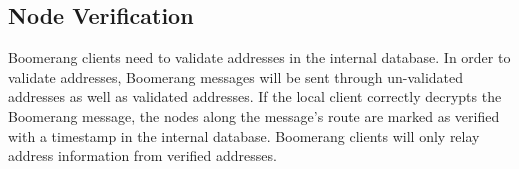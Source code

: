 

\subsection{Node Verification}
Boomerang clients need to validate addresses in the internal database. In order to validate addresses, Boomerang messages will be sent through un-validated addresses as well as validated addresses. If the local client correctly decrypts the Boomerang message, the nodes along the message’s route are marked as verified with a timestamp in the internal database. Boomerang clients will only relay address information from verified addresses.




